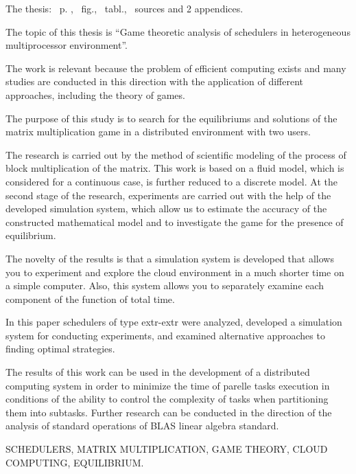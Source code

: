 
The thesis: \pageref*{MyLastPage}~p. , \totfig~fig., \tottab~tabl., ~sources and 2 appendices.

The topic of this thesis is ``Game theoretic analysis of schedulers in heterogeneous multiprocessor environment''.

The work is relevant because the problem of efficient computing exists and many studies are conducted in this direction with the application of different approaches, including the theory of games.

The purpose of this study is to search for the equilibriums and solutions of the matrix multiplication game in a distributed environment with two users. 

The research is carried out by the method of scientific modeling of the process of block multiplication of the matrix. This work is based on a fluid model, which is considered for a continuous case, is further reduced to a discrete model. At the second stage of the research, experiments are carried out with the help of the developed simulation system, which allow us to estimate the accuracy of the constructed mathematical model and to investigate the game for the presence of equilibrium.

The novelty of the results is that a simulation system is developed that allows you to experiment and explore the cloud environment in a much shorter time on a simple computer. Also, this system allows you to separately examine each component of the function of total time.

In this paper schedulers of type extr-extr were analyzed, developed a simulation system for conducting experiments, and examined alternative approaches to finding optimal strategies.

The results of this work can be used in the development of a distributed computing system in order to minimize the time of parelle tasks execution in conditions of the ability to control the complexity of tasks when partitioning them into subtasks. Further research can be conducted in the direction of the analysis of standard operations of BLAS linear algebra standard.

\MakeUppercase{schedulers, matrix multiplication, game theory, cloud computing, equilibrium.} 
